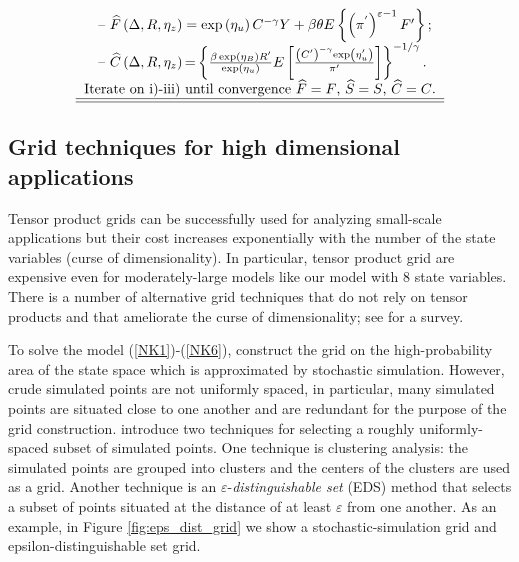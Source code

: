 \begin{equation*}
\begin{tabular}{l}
\quad -- $\widehat{{F}}\left( {\Delta ,R,\eta_z }\right) ={\exp }\left( {\eta }
_{{u}}\right) {C}^{{-\gamma }}{Y+\beta \theta }E\left \{ \left( {\pi }
^{^{\prime }}\right) ^{{\varepsilon -1}}{F}^{{\prime }}\right \} {;}$ \\

\quad -- $\widehat{{C}}\left( {\Delta ,R,\eta_z }\right) {=}\left \{ \frac{{
\beta \exp }\left( \eta _{{B}}\right) {R}^{{\prime }}}{{\exp }\left( {\eta }
_{{u}}\right) }E\left[ \frac{\left( {C}^{\prime }\right) ^{{-\gamma }}{\exp }
\left( {\eta }_{{u}}^{{\prime }}\right) }{{\pi }^{{\prime }}}\right] \right
\} ^{-1/\gamma }.$ \\

Iterate on i)-iii) until convergence $\widehat{F}=F$, $\widehat{S}=S$, $
\widehat{C}=C$. \\ \hline \hline
\end{tabular}
\end{equation*}

\subsection{Grid techniques for high dimensional applications}

Tensor product grids can be successfully used for analyzing small-scale
applications but their cost increases exponentially with the number of the
state variables (curse of dimensionality). In particular, tensor product grid
are expensive even for moderately-large models like our model with 8 state
variables. There is a number of alternative grid techniques that do not rely on
tensor products and that ameliorate the curse of dimensionality; see
\cite{MM2014} for a survey.

To solve the model (\ref{NK1})-(\ref{NK6}),
\cite{MM2015} construct the grid on the high-probability area of the state
space which is approximated by stochastic simulation. However, crude simulated points are not uniformly spaced, in particular, many
simulated points are situated close to one another and are redundant for the
purpose of the grid construction. \cite{MM2015} introduce two techniques for
selecting a roughly uniformly-spaced subset of simulated points. One technique
is clustering analysis: the simulated points are grouped into clusters and the
centers of the clusters are used as a grid. Another technique is an
$\varepsilon $-\textit{distinguishable set} (EDS) method that selects a subset
of points situated at the distance of at least $ \varepsilon $ from one
another. As an example, in Figure \ref{fig:eps_dist_grid} we show a
stochastic-simulation grid and epsilon-distinguishable set grid.

